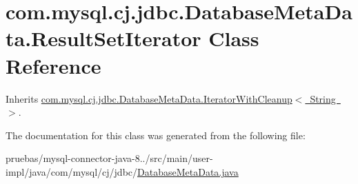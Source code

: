 \hypertarget{classcom_1_1mysql_1_1cj_1_1jdbc_1_1_database_meta_data_1_1_result_set_iterator}{}\section{com.\+mysql.\+cj.\+jdbc.\+Database\+Meta\+Data.\+Result\+Set\+Iterator Class Reference}
\label{classcom_1_1mysql_1_1cj_1_1jdbc_1_1_database_meta_data_1_1_result_set_iterator}


Inherits \mbox{\hyperlink{classcom_1_1mysql_1_1cj_1_1jdbc_1_1_database_meta_data_1_1_iterator_with_cleanup}{com.\+mysql.\+cj.\+jdbc.\+Database\+Meta\+Data.\+Iterator\+With\+Cleanup$<$ String $>$}}.



The documentation for this class was generated from the following file\+:\begin{DoxyCompactItemize}
\item 
pruebas/mysql-\/connector-\/java-\/8../src/main/user-\/impl/java/com/mysql/cj/jdbc/\mbox{\hyperlink{_database_meta_data_8java}{Database\+Meta\+Data.\+java}}\end{DoxyCompactItemize}
